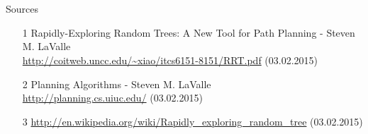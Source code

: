 \documentclass[%
  professionalfonts,%
  xcolor={%
    usenames,%
    dvipsnames,%
    svgnames,%
    table,%
    hyperref%
  }%
]{beamer}
\begin{document}
  \section{}
    \begin{frame}{Sources}
      \begin{itemize}
        \item[1] Rapidly-Exploring Random Trees: A New Tool for Path Planning - Steven M. LaValle 
        \\\url{http://coitweb.uncc.edu/~xiao/itcs6151-8151/RRT.pdf} (03.02.2015)
        \item[2] Planning Algorithms - Steven M. LaValle \\\url{http://planning.cs.uiuc.edu/} (03.02.2015)
        \item[3] \url{http://en.wikipedia.org/wiki/Rapidly_exploring_random_tree} (03.02.2015)
    \end{itemize}
  \end{frame}
  
  \begin{frame}
    \Huge{}
  \end{frame}
\end{document}
